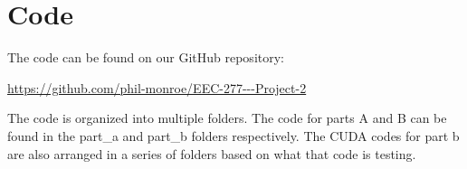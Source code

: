 \documentclass[12pt] {article}
\begin{document}
\clearpage
\section{Code}
\begin{center}
	The code can be found on our GitHub repository:

	\url {https://github.com/phil-monroe/EEC-277---Project-2}
\end{center}

The code is organized into multiple folders. The code for parts A and B can be found in the part\_a and part\_b folders respectively. The CUDA codes for part b are also arranged in a series of folders based on what that code is testing.
\end{document}
